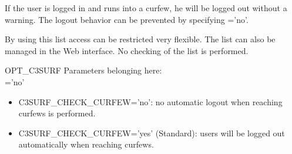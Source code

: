 \begin{description}
  If the user is logged in and runs into a curfew, he will be logged out without a warning.
  The logout behavior can be prevented by specifying 
  {}='no'.

  By using this list access can be restricted very flexible. The list can also be managed in the
  Web interface. No checking of the list is performed. 

  OPT\_C3SURF Parameters belonging here:\\
  ='no'
    \begin{itemize}
        \item{C3SURF\_CHECK\_CURFEW='no'}: no automatic logout when reaching curfews is performed.
        \item{C3SURF\_CHECK\_CURFEW='yes'} (Standard): users will be logged out automatically when reaching curfews.
    \end{itemize}
\end{description}
